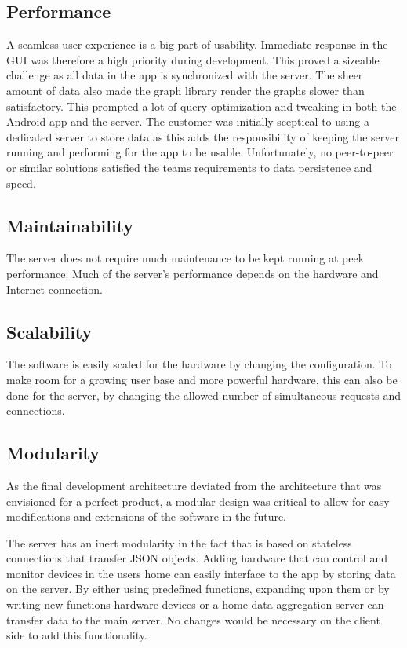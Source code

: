 \subsection{Performance}
A seamless user experience is a big part of usability. Immediate response in the GUI was therefore a high priority during development. This proved a sizeable challenge as all data in the app is synchronized with the server. 
The sheer amount of data also made the graph library render the graphs slower than satisfactory. This prompted a lot of query optimization and tweaking 
in both the Android app and the server. 
The customer was initially sceptical to using a dedicated server to store data as this adds the responsibility of keeping the server running and performing for the app to be usable. Unfortunately, no peer-to-peer or similar solutions satisfied the teams requirements to data persistence and speed.

\subsection{Maintainability}
The server does not require much maintenance to be kept running at peek performance. Much of the server's performance depends on the hardware and Internet connection. 

\subsection{Scalability}
The software is easily scaled for the hardware by changing the configuration.  To make room for a growing user base and more powerful hardware, this can also be done for the server, by changing the allowed number of simultaneous requests and connections.


\subsection{Modularity}
\label{sec:modularity}
As the final development architecture deviated from the architecture that was envisioned for a perfect product, a modular design was critical to allow for easy modifications and 
extensions of the software in the future. 

The server has an inert  modularity in the fact that is based on stateless connections that transfer JSON objects. Adding hardware that can control and monitor devices in the users 
home can easily interface to the app by storing data on the server. By either using predefined functions, expanding upon them or by writing new functions hardware devices or a home data aggregation server can transfer data to the main server. No changes would be necessary on the client side to add this functionality. 
